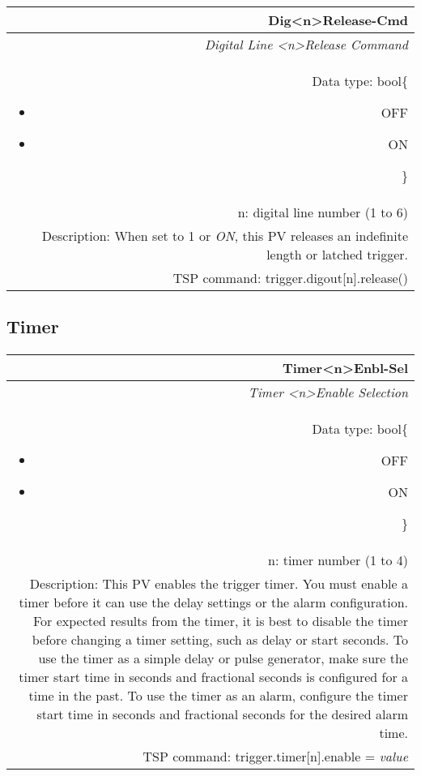 \documentclass[openany]{article}
\begin{document}
		\begin{tabular}{N}
			\hline
			\bfseries Dig{\textless n\textgreater}Release-Cmd\label{pv:digrelease-cmd} \\ \hline
			\emph{Digital Line \textless n\textgreater Release Command} \\
			Data type: bool\{\begin{itemize}[noitemsep]
				\small
				\item[] OFF
				\item[] ON
			\end{itemize}\} \\
			n: digital line number (1 to 6) \\
			Description: When set to 1 or \emph{ON}, this PV releases an indefinite length or latched trigger. \\
			TSP command: trigger.digout[n].release()
		\end{tabular}

	\subsection{Timer}\label{pvgroup:timer}

		\paragraph{} %

		\begin{tabular}{N}
			\hline
			\bfseries Timer{\textless n\textgreater}Enbl-Sel\label{pv:timerenbl-sel} \\ \hline
			\emph{Timer \textless n\textgreater Enable Selection} \\
			Data type: bool\{\begin{itemize}[noitemsep]
				\small
				\item[] OFF
				\item[] ON
			\end{itemize}\} \\
			n: timer number (1 to 4) \\
			Description: This PV enables the trigger timer. You must enable a timer before it can use the delay settings or the alarm configuration. For expected results from the timer, it is best to disable the timer before changing a timer setting, such as delay or start seconds. To use the timer as a simple delay or pulse generator, make sure the timer start time in seconds and fractional seconds is configured for a time in the past. To use the timer as an alarm, configure the timer start time in seconds and fractional seconds for the desired alarm time.\\
			TSP command: trigger.timer[n].enable = \emph{value}
		\end{tabular}
\end{document}
